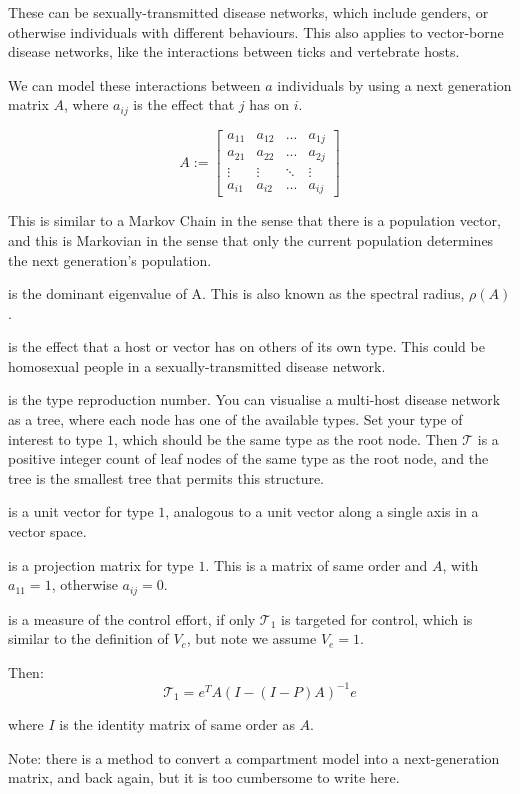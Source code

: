 \documentclass[twocolumn]{article}
\begin{document}
These can be sexually-transmitted disease networks, which include genders, or otherwise individuals with different behaviours. This also applies to vector-borne disease networks, like the interactions between ticks and vertebrate hosts.

We can model these interactions between $ a $ individuals by using a next generation matrix $ A $, where $ a_{ij} $ is the effect that $ j $ has on $ i $.

\begin{equation}
    A := \left[
    \begin{matrix}
        a_{11} & a_{12} & ... & a_{1j} \\
        a_{21} & a_{22} & ... & a_{2j} \\
        \vdots & \vdots & \ddots & \vdots \\
        a_{i1} & a_{i2} & ... & a_{ij} 
    \end{matrix}
    \right] \nonumber 
\end{equation}

This is similar to a Markov Chain in the sense that there is a population vector, and this is Markovian in the sense that only the current population determines the next generation's population.

\begin{description}[leftmargin=1cm, style=nextline]
  \item[$ R_0 = \max\{|\lambda_1|, |\lambda_2|, ... \} $]
    is the dominant eigenvalue of A. This is also known as the spectral radius, $ \rho(A) $.
  \item[$ a_{ij} , i=j $]
    is the effect that a host or vector has on others of its own type. This could be homosexual people in a sexually-transmitted disease network.
  \item[$ \mathcal{T} $]
    is the type reproduction number. You can visualise a multi-host disease network as a tree, where each node has one of the available types. Set your type of interest to type $ 1 $, which should be the same type as the root node. Then $ \mathcal{T} $ is a positive integer count of leaf nodes of the same type as the root node, and the tree is the smallest tree that permits this structure.
  \item[$ e $]
    is a unit vector for type $ 1 $, analogous to a unit vector along a single axis in a vector space.
  \item[$ P $]
    is a projection matrix for type $ 1 $. This is a matrix of same order and $ A $, with $ a_{11} = 1$, otherwise $ a_{ij} = 0 $.
  \item[$1 - 1/\mathcal{T}_1$]
    is a measure of the control effort, if only $\mathcal{T}_1$ is targeted for control, which is similar to the definition of $ V_c $, but note we assume $ V_e = 1 $.
    
\end{description}

Then:
\begin{equation}
 \mathcal{T}_1 = e^T A(I - (I-P)A)^{-1}e \nonumber
\end{equation}

where $ I $ is the identity matrix of same order as $ A $.

Note: there is a method to convert a compartment model into a next-generation matrix, and back again, but it is too cumbersome to write here.
\end{document}
